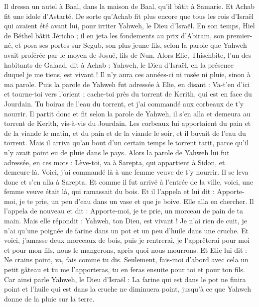\begin{multicols}{2}
Il dressa un autel à Baal, dans la maison de Baal, qu'il bâtit à Samarie.
Et Achab fit une idole d’Astarté. De sorte qu'Achab fit plus encore que tous les rois d'Israël qui avaient été avant lui, pour irriter Yahweh, le Dieu d'Israël.
En son temps, Hiel de Béthel bâtit Jéricho ; il en jeta les fondements au prix d’Abiram, son premier-né, et posa ses portes sur Segub, son plus jeune fils, selon la parole que Yahweh avait proférée par le moyen de Josué, fils de Nun.
\VerseOne{}Alors Elie, Thischbite, l’un des habitants de Galaad, dit à Achab : Yahweh, le Dieu d'Israël, en la présence duquel je me tiens, est vivant ! Il n'y aura ces années-ci ni rosée ni pluie, sinon à ma parole.
Puis la parole de Yahweh fut adressée à Elie, en disant :
Va-t'en d'ici et tourne-toi vers l'orient ; cache-toi près du torrent de Kerith, qui est en face du Jourdain.
Tu boiras de l’eau du torrent, et j'ai commandé aux corbeaux de t'y nourrir.
Il partit donc et fit selon la parole de Yahweh, il s'en alla et demeura au torrent de Kerith, vis-à-vis du Jourdain.
Les corbeaux lui apportaient du pain et de la viande le matin, et du pain et de la viande le soir, et il buvait de l’eau du torrent.
Mais il arriva qu'au bout d’un certain temps le torrent tarit, parce qu'il n'y avait point eu de pluie dans le pays.
Alors la parole de Yahweh lui fut adressée, en ces mots :
Lève-toi, va à Sarepta, qui appartient à Sidon, et demeure-là. Voici, j'ai commandé là à une femme veuve de t'y nourrir.
Il se leva donc et s'en alla à Sarepta. Et comme il fut arrivé à l’entrée de la ville, voici, une femme veuve était là, qui ramassait du bois. Et il l'appela et lui dit : Apporte-moi, je te prie, un peu d'eau dans un vase et que je boive.
Elle alla en chercher. Il l’appela de nouveau et dit : Apporte-moi, je te prie, un morceau de pain de ta main.
Mais elle répondit : Yahweh, ton Dieu, est vivant ! Je n'ai rien de cuit, je n'ai qu’une poignée de farine dans un pot et un peu d'huile dans une cruche. Et voici, j'amasse deux morceaux de bois, puis je rentrerai, je l'apprêterai pour moi et pour mon fils, nous le mangerons, après quoi nous mourrons.
Et Elie lui dit : Ne crains point, va, fais comme tu dis. Seulement, fais-moi d’abord avec cela un petit gâteau et tu me l’apporteras, tu en feras ensuite pour toi et pour ton fils.
Car ainsi parle Yahweh, le Dieu d'Israël : La farine qui est dans le pot ne finira point et l'huile qui est dans la cruche ne diminuera point, jusqu'à ce que Yahweh donne de la pluie sur la terre.

\end{multicols}

